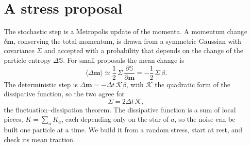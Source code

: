 \documentclass[11pt,aps,preprint,nofootinbib,superscriptaddress,tightenlines]{revtex4-2}
\def\st{\begin{equation}}
\def\stp{\end{equation}}
\newcommand{\avg}[1]{\langle #1\rangle}
\begin{document}
\section{A stress proposal}
\label{sec:stress}

The stochastic step is a Metropolis update of the momenta.  A momentum change
$\delta\bm m$, conserving the total momentum, is drawn from a symmetric Gaussian
with covariance $\Sigma$ and accepted with a probability that depends on the
change of the particle entropy $\Delta\mathbb S$.  For small proposals the mean
change is
\st
\avg{\Delta\bm m}\simeq\frac12\,\Sigma\,\frac{\partial\mathbb S}{\partial\bm m}=-\frac12\,\Sigma\,\beta .
\stp
The deterministic step is $\Delta\bm m=-\Delta t\,\mathcal K\beta$, with $\mathcal K$ the
quadratic form of the dissipative function, so the two agree for
\st
\Sigma=2\Delta t\,\mathcal K ,
\stp
the fluctuation--dissipation theorem.  The dissipative function is a sum of
local pieces, $K=\sum_aK_a$, each depending only on the star of $a$, so the noise
can be built one particle at a time.  We build it from a random stress, start
at rest, and check its mean traction.
\end{document}

